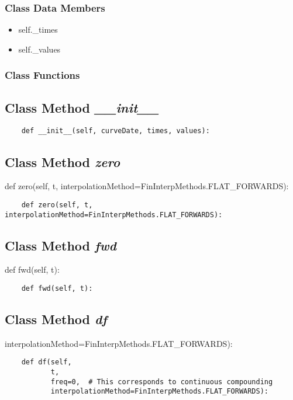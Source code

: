 \documentclass[twoside,11pt]{book}
\begin{document}
\subsubsection{Class Data Members}
\begin{itemize}
\item{self.\_times}
\item{self.\_values}
\end{itemize}

\subsubsection{Class Functions}

\subsection{Class Method {\it \_\_init\_\_}}


\begin{lstlisting}
    def __init__(self, curveDate, times, values):
\end{lstlisting}

\subsection{Class Method {\it zero}}
def zero(self, t, interpolationMethod=FinInterpMethods.FLAT\_FORWARDS):

\begin{lstlisting}
    def zero(self, t, interpolationMethod=FinInterpMethods.FLAT_FORWARDS):
\end{lstlisting}

\subsection{Class Method {\it fwd}}
def fwd(self, t):

\begin{lstlisting}
    def fwd(self, t):
\end{lstlisting}

\subsection{Class Method {\it df}}
interpolationMethod=FinInterpMethods.FLAT\_FORWARDS):

\begin{lstlisting}
    def df(self,
           t,
           freq=0,  # This corresponds to continuous compounding
           interpolationMethod=FinInterpMethods.FLAT_FORWARDS):
\end{lstlisting}
\end{document}
